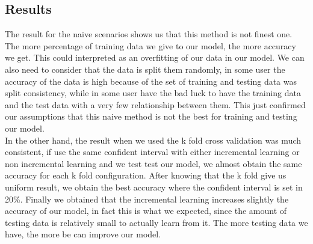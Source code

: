 \subsection{Results}\label{subsec:results}
The result for the naive scenarios shows us that this method is not finest one. The more percentage of training data we give to our model, the more accuracy we get. This could interpreted as an overfitting of our data in our model. We can also need to consider that the data is split them randomly, in some user the accuracy of the data is high because of the set of training and testing data was split consistency, while in some user have the bad luck to have the training data and the test data with a very few relationship between them. This just confirmed our assumptions that this naive method is not the best for training and testing our model.
\\[2ex]
In the other hand, the result when we used the k fold cross validation was much consistent, if use the same confident interval with either incremental learning or non incremental learning and we test test our model, we almost obtain the same accuracy for each k fold configuration. After knowing that the k fold give us uniform result, we obtain the best accuracy where the confident interval is set in 20\%. Finally we obtained that the incremental learning increases slightly the accuracy of our model, in fact this is what we expected, since the amount of testing data is relatively small to actually learn from it. The more testing data we have, the more be can improve our model.